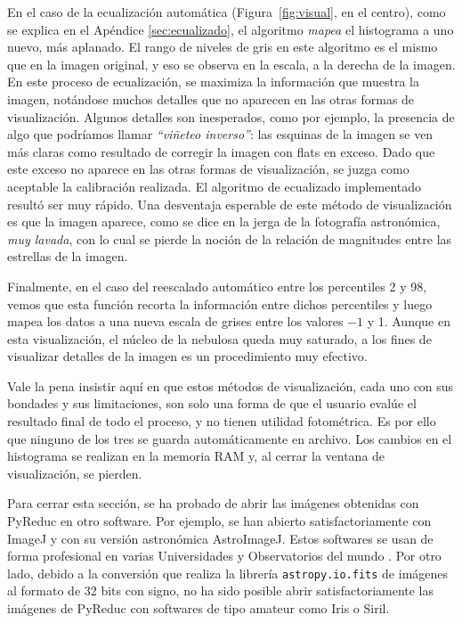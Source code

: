 \documentclass[a4paper, 12pt]{article}
\begin{document}
En el caso de la ecualización automática (Figura~\ref{fig:visual}, en el centro), como se explica en el Apéndice \ref{sec:ecualizado}, el algoritmo {\it mapea} el histograma a uno nuevo, más aplanado. El rango de niveles de gris en este algoritmo es el mismo que en la imagen original, y eso se observa en la escala, a la derecha de la imagen. En este proceso de ecualización, se maximiza la información que muestra la imagen, notándose muchos detalles que no aparecen en las otras formas de visualización. Algunos detalles son inesperados, como por ejemplo, la presencia de algo que podríamos llamar {\it ``viñeteo inverso''}: las esquinas de la imagen se ven más claras como resultado de corregir la imagen con flats en exceso. Dado que este exceso no aparece en las otras formas de visualización, se juzga como aceptable la calibración realizada. El algoritmo de ecualizado implementado resultó ser muy rápido. Una desventaja esperable de este método de visualización es que la imagen aparece, como se dice en la jerga de la fotografía astronómica, {\it muy lavada}, con lo cual se pierde la noción de la relación de magnitudes entre las estrellas de la imagen.

Finalmente, en el caso del reescalado automático entre los percentiles 2 y 98, vemos que esta función recorta la información entre dichos percentiles y luego mapea los datos a una nueva escala de grises entre los valores $-1$ y 1.
Aunque en esta visualización, el núcleo de la nebulosa queda muy saturado, a los fines de visualizar detalles de la imagen es un procedimiento muy efectivo.

Vale la pena insistir aquí en que estos métodos de visualización, cada uno con sus bondades y sus limitaciones, son solo una forma de que el usuario evalúe el resultado final de todo el proceso, y no tienen utilidad fotométrica. Es por ello que ninguno de los tres se guarda automáticamente en archivo. Los cambios en el histograma se realizan en la memoria RAM y, al cerrar la ventana de visualización, se pierden.

Para cerrar esta sección, se ha probado de abrir las imágenes obtenidas con PyReduc en otro software. Por ejemplo, se han abierto satisfactoriamente con ImageJ y con su versión astronómica AstroImageJ. Estos softwares se usan de forma profesional en varias Universidades y Observatorios del mundo \cite{craig}. Por otro lado, debido a la conversión que realiza la librería \texttt{astropy.io.fits} de imágenes al formato de 32 bits con signo, no ha sido posible abrir satisfactoriamente las imágenes de PyReduc con softwares de tipo amateur como Iris o Siril.
\end{document}
